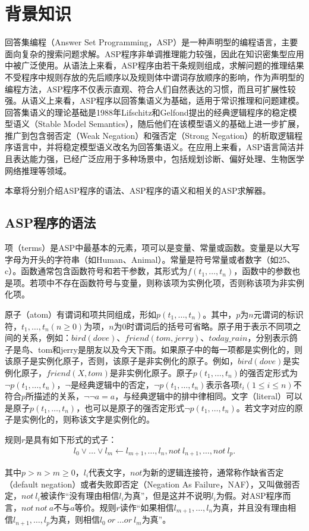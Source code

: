 \chapter{背景知识}
\label{chp:initialization}

回答集编程（Answer Set Programming，ASP）是一种声明型的编程语言，主要面向复杂的搜索问题求解。ASP程序非单调推理能力较强，因此在知识密集型应用中被广泛使用。从语法上来看，ASP程序由若干条规则组成，求解问题的推理结果不受程序中规则存放的先后顺序以及规则体中谓词存放顺序的影响，作为声明型的编程方法，ASP程序不仅表示直观、符合人们自然表达的习惯，而且可扩展性较强。从语义上来看，ASP程序以回答集语义为基础，适用于常识推理和问题建模。回答集语义的理论基础是1988年Lifschitz和Gelfond提出的经典逻辑程序的稳定模型语义（Stable Model Semantics）\cite{1992The}，随后他们在该模型语义的基础上进一步扩展，推广到包含弱否定（Weak Negation）和强否定（Strong Negation）的析取逻辑程序语言中，并将稳定模型语义改名为回答集语义。在应用上来看，ASP语言简洁并且表达能力强，已经广泛应用于多种场景中，包括规划诊断\cite{2002Answer}、偏好处理\cite{2003A}、生物医学网络推理\cite{2006Modelling}等领域。

本章将分别介绍ASP程序的语法、ASP程序的语义和相关的ASP求解器。
\section{ASP程序的语法}
项（terms）是ASP中最基本的元素，项可以是变量、常量或函数。变量是以大写字母为开头的字符串（如Human、Animal）。常量是符号常量或者数字（如25、c）。函数通常包含函数符号和若干参数，其形式为$f(t_1,\ldots,t_n)$，函数中的参数也是项。若项中不存在函数符号与变量，则称该项为实例化项，否则称该项为非实例化项。

原子（atom）有谓词和项共同组成，形如$p(t_1,\ldots,t_n)$。其中，$p$为$n$元谓词的标识符，$t_1,\ldots,t_n(n \geq 0)$为项，$n$为$0$时谓词后的括号可省略。原子用于表示不同项之间的关系，例如：$bird(dove)$、$friend(tom, jerry)$、$today\_rain$，分别表示鸽子是鸟、tom和jerry是朋友以及今天下雨。如果原子中的每一项都是实例化的，则该原子是实例化原子，否则，该原子是非实例化的原子。例如，$bird(dove)$是实例化原子，$friend(X,tom)$是非实例化原子。原子$p(t_1,\ldots,t_n)$的强否定形式为$\lnot p(t_1,\ldots,t_n)$，$\lnot$是经典逻辑中的否定，$\lnot p(t_1,\ldots,t_n)$表示各项$t_i(1 \le i \le n)$不符合$p$所描述的关系，$\lnot \lnot a = a$，与经典逻辑中的排中律相同。文字（literal）可以是原子$p(t_{1},\ldots,t_n )$，也可以是原子的强否定形式$\neg p(t_{1},\ldots,t_n )$。若文字对应的原子是实例化的，则称该文字是实例化的。
\begin{definition}[规则]规则$r$是具有如下形式的式子：
    \begin{align}
        \label{rule:1}
        l_0 \lor \ldots \lor l_m \leftarrow l_{m+1}, \ldots, l_n, not\ l_{n+1}, \ldots, not\ l_p.
    \end{align}
\end{definition}
其中$p > n > m \geq 0$，$l_i$代表文字，$not$为新的逻辑连接符，通常称作缺省否定（default negation）或者失败即否定（Negation As Failure，NAF），又叫做弱否定，$not \ l_i$被读作“没有理由相信$l_i$为真”，但是这并不说明$l_i$为假。对ASP程序而言，$not\ not\ a$不与$a$等价。规则$r$读作“如果相信$l_{m+1}, \ldots, l_n$为真，并且没有理由相信$l_{n+1}, \ldots, l_p$为真，则相信$l_0\ or\ \ldots or\ l_m$为真”。

